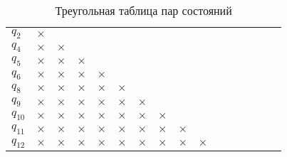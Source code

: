 \documentclass[a4paper,14pt,russian]{extarticle} %
\begin{document}
\begin{sidewaystable}			
	\centering		
	\caption{Треугольная таблица пар состояний}	
	\renewcommand{\tabcolsep}{0.6em}	
	\label{tab:minimization_table_second} 
	\begin{tabular}{l c c c c c c c c c c c c c c c }
		\cline{2-2}
		\multicolumn{1}{l|}{\({q_{2}}\)}& \multicolumn{1}{c|}{\(\times\)} \\ \cline{2-3}
		\multicolumn{1}{l|}{\({q_{4}}\)}& \multicolumn{1}{c|}{\(\times\)} & \multicolumn{1}{c|}{\(\times\)} \\ \cline{2-4}
		\multicolumn{1}{l|}{\({q_{5}}\)}& \multicolumn{1}{c|}{\(\times\)} & \multicolumn{1}{c|}{\(\times\)} & \multicolumn{1}{c|}{\(\times\)} \\ \cline{2-5}
		\multicolumn{1}{l|}{\({q_{6}}\)}& \multicolumn{1}{c|}{\(\times\)} & \multicolumn{1}{c|}{\(\times\)} & \multicolumn{1}{c|}{\(\times\)} & \multicolumn{1}{c|}{\(\times\)} \\ \cline{2-6}
		\multicolumn{1}{l|}{\({q_{8}}\)}& \multicolumn{1}{c|}{\(\times\)} & \multicolumn{1}{c|}{\(\times\)} & \multicolumn{1}{c|}{\(\times\)} & \multicolumn{1}{c|}{\(\times\)} & \multicolumn{1}{c|}{\(\times\)} \\ \cline{2-7}
		\multicolumn{1}{l|}{\({q_{9}}\)}& \multicolumn{1}{c|}{\(\times\)} & \multicolumn{1}{c|}{\(\times\)} & \multicolumn{1}{c|}{\(\times\)} & \multicolumn{1}{c|}{\(\times\)} & \multicolumn{1}{c|}{\(\times\)} & \multicolumn{1}{c|}{\(\times\)} \\ \cline{2-8}
		\multicolumn{1}{l|}{\({q_{10}}\)}& \multicolumn{1}{c|}{\(\times\)} & \multicolumn{1}{c|}{\(\times\)} & \multicolumn{1}{c|}{\(\times\)} & \multicolumn{1}{c|}{\(\times\)} & \multicolumn{1}{c|}{\(\times\)} & \multicolumn{1}{c|}{\(\times\)} & \multicolumn{1}{c|}{\(\times\)} \\ \cline{2-9}
		\multicolumn{1}{l|}{\({q_{11}}\)}& \multicolumn{1}{c|}{\(\times\)} & \multicolumn{1}{c|}{\(\times\)} & \multicolumn{1}{c|}{\(\times\)} & \multicolumn{1}{c|}{\(\times\)} & \multicolumn{1}{c|}{\(\times\)} & \multicolumn{1}{c|}{\(\times\)} & \multicolumn{1}{c|}{\(\times\)} & \multicolumn{1}{c|}{\(\times\)} \\ \cline{2-10}
		\multicolumn{1}{l|}{\({q_{12}}\)}& \multicolumn{1}{c|}{\(\times\)} & \multicolumn{1}{c|}{\(\times\)} & \multicolumn{1}{c|}{\(\times\)} & \multicolumn{1}{c|}{\(\times\)} & \multicolumn{1}{c|}{\(\times\)} & \multicolumn{1}{c|}{\(\times\)} & \multicolumn{1}{c|}{\(\times\)} & \multicolumn{1}{c|}{\(\times\)} & \multicolumn{1}{c|}{\(\times\)} \\ \cline{2-11}

\end{tabular}
\end{sidewaystable}
\end{document}

